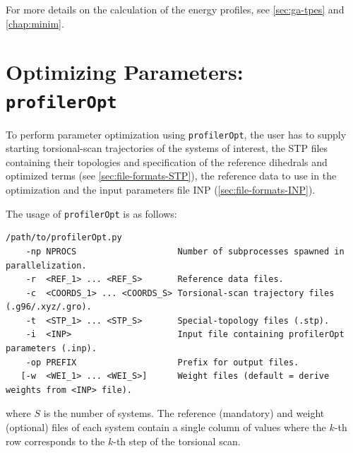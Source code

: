 \documentclass[10pt,a4paper]{report}
\numberwithin{equation}{section}
\newcommand{\profileropt}[0]{\texttt{profilerOpt}}
\begin{document}
For more details on the calculation of the energy profiles, see \autoref{sec:ga-tpes} and \autoref{chap:minim}.

\section{Optimizing Parameters: \profileropt{}}
\label{sec:program-opt}

To perform parameter optimization using \profileropt{}, the user has
to supply starting torsional-scan trajectories of the systems of
interest, the STP files containing their topologies and specification
of the reference dihedrals and optimized terms (see
\autoref{sec:file-formats-STP}), the reference data to use in the
optimization and the input parameters file INP
(\autoref{sec:file-formats-INP}).

The usage of \profileropt{} is as follows:

\begin{lstlisting}
/path/to/profilerOpt.py
    -np NPROCS                    Number of subprocesses spawned in parallelization.
    -r  <REF_1> ... <REF_S>       Reference data files.
    -c  <COORDS_1> ... <COORDS_S> Torsional-scan trajectory files (.g96/.xyz/.gro).
    -t  <STP_1> ... <STP_S>       Special-topology files (.stp).
    -i  <INP>                     Input file containing profilerOpt parameters (.inp).
    -op PREFIX                    Prefix for output files.
   [-w  <WEI_1> ... <WEI_S>]      Weight files (default = derive weights from <INP> file).
\end{lstlisting}\vspace{-2ex} where $S$ is the number of systems.
The reference (mandatory) and weight (optional) files of each system contain a single column
of values where the $k$-th row corresponds to the $k$-th step of the
torsional scan.
\end{document}
